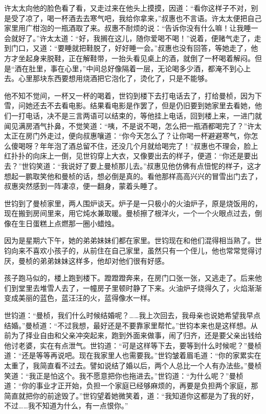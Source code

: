 \par 许太太向他的脸色看了看，又走过来在他头上摸摸，因道：“看你这样子不对，别是受了凉了，喝一杯酒去去寒气吧，我给你拿来，”叔惠也不言语。许太太便把自己家里用广柑泡的一瓶酒取了来。叔惠不耐烦的说：“告诉你没有什么嘛！让我睡一会就好了。”许太太道：“好，我搁在这儿，随你爱喝不喝！”说着，便赌气走了，走到门口，又道：“要睡就把鞋脱了，好好睡一会。”叔惠也没有回答，等她走了，他方才坐起身来脱鞋，正在解鞋带，一抬头看见桌上的酒，就倒了一杯喝着解闷。但是“酒在肚里，事在心里，”中间总好像隔着一层，无论喝多少酒，都淹不到心上去。心里那块东西要想用烧酒把它泡化了，烫化了，只是不能够。
\par 他不知不觉间，一杯又一杯的喝着，世钧到楼下去打电话去了，打给曼桢，因为下雪，问她还去不去看电影。结果看电影是作罢了，但是仍旧要到她家里去看她，他们一打电话，决不是三言两语可以结束的，等他挂上电话，回到楼上来，一进门就闻见满房酒气扑鼻，不觉笑道：“咦，不是说不喝，怎么把一瓶酒都喝完了？”许太太正在房门外走过，便向叔惠嚷道：“你今天怎么了？让你喝一杯避避寒气，你怎么傻喝呀？年年泡了酒总留不住，还没几个月就给喝完了！”叔惠也不理会，脸上红扑扑的向床上一倒，见世钧穿上大衣，又像要出去的样子，便道：“你还是要出去？”世钧笑道：“我说好了要上曼桢那儿去。”叔惠见他仿佛有点忸怩的样子，这才想起一鹏取笑他和曼桢的话，想必倒是真的。看他那样高高兴兴的冒雪出门去了，叔惠突然感到一阵凄凉，便一翻身，蒙着头睡了。
\par 世钧到了曼桢家里，两人围炉谈天。炉子是一只极小的火油炉子，原是烧饭用的，现在搬到房间里来，用它炖水兼取暖。曼桢擦了根洋火，一个一个火眼点过去，倒像在生日蛋糕上点燃那一圈小蜡烛。
\par 因为是星期六下午，她的弟弟妹妹们都在家里。世钧现在和他们混得相当熟了。世钧向来不喜欢小孩子的，从前住在自己家里，虽然只有一个侄儿，他也常常觉得讨厌，曼桢的弟弟妹妹这样多，他却对他们很有好感。
\par 孩子跑马似的，楼上跑到楼下。蹬蹬蹬奔来，在房门口张一张，又逃走了。后来他们到堂里去堆雪人去了，一幢房子里顿时静了下来。火油炉子烧得久了，火焰渐渐变成美丽的蓝色，蓝汪汪的火，蓝得像水一样。
\par 世钧道：“曼桢，我们什么时候结婚呢？……我上次回去，我母亲也说她希望我早点结婚。”曼桢道：“不过我想，最好还是不要靠家里帮忙。”世钧本来也是这样想。从前为了择业自由和父亲冲突起来，跑到外面来做事，闹了归齐，还是要父亲出钱给他讨老婆，实在有点泄气。世钧道：“可是这样等下去，要等到什么时候呢？”曼桢道：“还是等等再说吧。现在我家里人也需要我。”世钧皱着眉毛道：“你的家累实在太重了，我简直看不过去。譬如说结了婚以后，两个人总比一个人有办法些。”曼桢笑道：“我正是怕这个。我不愿意把你也拖进去。”世钧道：“为什么呢？”曼桢道：“你的事业才正开始，负担一个家庭已经够麻烦的，再要是负担两个家庭，那简直就把你的前途毁了。”世钧望着她微笑着，道：“我知道你这都是为了我的好，不过……我不知道为什么，有一点恨你。”
